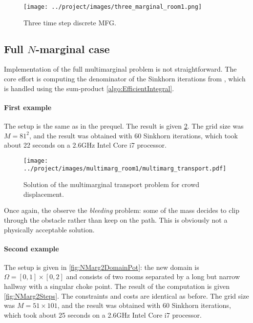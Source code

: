 \documentclass[../report.tex]{subfiles}
\begin{document}
\begin{figure}[h]
	\centering
	\texttt{[image: ../project/images/three\_marginal\_room1.png]}
	\caption{Three time step discrete MFG.}\label{fig:3MargTransport}
\end{figure}





\subsection{Full $N$-marginal case}

Implementation of the full multimarginal problem is not straightforward. The core effort is computing the denominator of the Sinkhorn iterations from , which is handled using the sum-product \cref{algo:EfficientIntegral}.


\paragraph{First example} The setup is the same as in the prequel. The result is given \cref{fig:NMargEx1Soltn}. The grid size was $M = 81^2$, and the result was obtained with 60 Sinkhorn iterations, which took about 22 seconds on a 2.6GHz Intel Core i7 processor.

\begin{figure}[h]
	\texttt{[image: ../project/images/multimarg\_room1/multimarg\_transport.pdf]}
	\caption{Solution of the multimarginal transport problem for crowd displacement.}\label{fig:NMargEx1Soltn}
\end{figure}

Once again, the observe the \textit{bleeding} problem: some of the mass decides to clip through the obstacle rather than keep on the path. This is obviously not a physically acceptable solution.


\paragraph{Second example} The setup is given in \cref{fig:NMarg2DomainPot}: the new domain is $\Omega = [0,1] \times [0,2]$ and consists of two rooms separated by a long but narrow hallway with a singular choke point. The result of the computation is given \cref{fig:NMarg2Steps}. The constraints and costs are identical as before. The grid size was $M = 51 \times 101$, and the result was obtained with 60 Sinkhorn iterations, which took about 25 seconds on a 2.6GHz Intel Core i7 processor.
\end{document}
